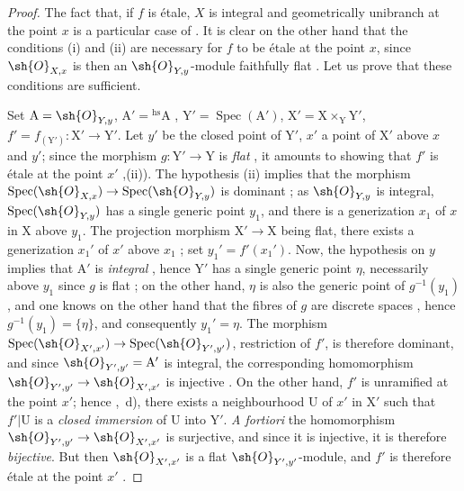 \begin{proof}
The fact that, if $f$ is \'etale, $X$ is integral and geometrically unibranch at the point $x$ is a particular case of .
It is clear on the other hand that the conditions (i) and (ii) are necessary for $f$ to be \'etale at the point $x$, since $\sh{O}_{X,x}$ is then an $\sh{O}_{Y,y}$-module faithfully flat .
Let us prove that these conditions are sufficient.

Set $\mathrm{A}=\sh{O}_{Y,y}$, $\mathrm{A}'={}^{\mathrm{hs}}\mathrm{A}$ , $\mathrm{Y}'=\operatorname{Spec}(\mathrm{A}')$, $\mathrm{X}'=\mathrm{X}\times_{\mathrm{Y}}\mathrm{Y}'$, $f'=f_{(\mathrm{Y}')}:\mathrm{X}'\to\mathrm{Y}'$.
Let $y'$ be the closed point of $\mathrm{Y}'$, $x'$ a point of $\mathrm{X}'$ above $x$ and $y'$; since the morphism $g:\mathrm{Y}'\to\mathrm{Y}$ is \emph{flat} , it amounts to showing that $f'$ is \'etale at the point $x'$ ,(ii)).
The hypothesis (ii) implies that the morphism $\operatorname{Spec}(\sh{O}_{X,x})\to\operatorname{Spec}(\sh{O}_{Y,y})$ is dominant ; as $\sh{O}_{Y,y}$ is integral, $\operatorname{Spec}(\sh{O}_{Y,y})$ has a single generic point $y_1$, and there is a generization $x_1$ of $x$ in $\mathrm{X}$ above $y_1$.
The projection morphism $\mathrm{X}'\to\mathrm{X}$ being flat, there exists a generization $x_1'$ of $x'$ above $x_1$ ; set $y_1'=f'(x_1')$.
Now, the hypothesis on $y$ implies that $\mathrm{A}'$ is \emph{integral} , hence $\mathrm{Y}'$ has a single generic point $\eta$, necessarily above $y_1$ since $g$
is flat ; on the other hand, $\eta$ is also the generic point of $g^{-1}(y_1)$ , and one knows on the other hand that the fibres of $g$ are discrete spaces , hence $g^{-1}(y_1)=\{\eta\}$, and consequently $y_1'=\eta$.
The morphism $\operatorname{Spec}(\sh{O}_{X',x'})\to\operatorname{Spec}(\sh{O}_{Y',y'})$, restriction of $f'$, is therefore dominant, and since $\sh{O}_{Y',y'}=\mathrm{A}'$ is integral, the corresponding homomorphism $\sh{O}_{Y',y'}\to\sh{O}_{X',x'}$ is injective .
On the other hand, $f'$ is unramified at the point $x'$; hence ,~d), there exists a neighbourhood $\mathrm{U}$ of $x'$ in $\mathrm{X}'$ such that $f'|\mathrm{U}$ is a \emph{closed immersion} of U into $\mathrm{Y}'$.
\emph{A fortiori} the homomorphism $\sh{O}_{Y',y'}\to\sh{O}_{X',x'}$ is surjective, and since it is injective, it is therefore \emph{bijective}.
But then $\sh{O}_{X',x'}$ is a flat $\sh{O}_{Y',y'}$-module, and $f'$ is therefore \'etale at the point $x'$ .


\end{proof}
